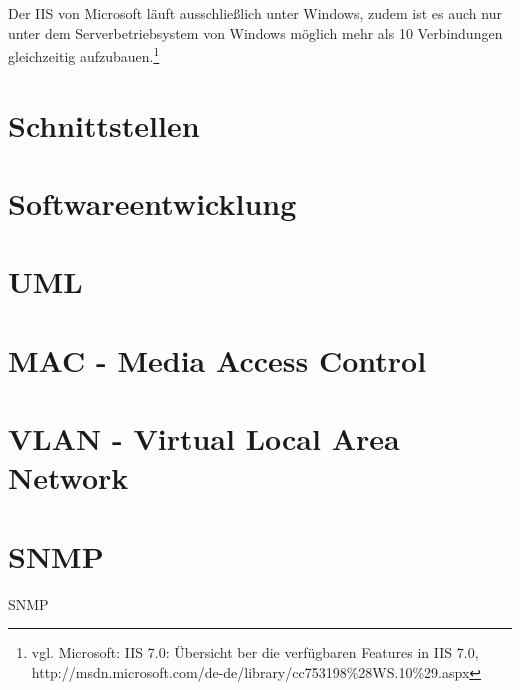 Der IIS von Microsoft läuft ausschließlich unter Windows, zudem ist es auch nur unter dem Serverbetriebsystem von Windows möglich mehr als 10 Verbindungen gleichzeitig aufzubauen.\footnote{vgl. Microsoft: IIS 7.0: Übersicht ber die verfügbaren Features in IIS 7.0, http://msdn.microsoft.com/de-de/library/cc753198\%28WS.10\%29.aspx}

\section{Schnittstellen}
\label{sec:schnittstellen}

\section{Softwareentwicklung}
\label{sec:softdev}

\section{UML}
\label{sec:uml}

\section{MAC - Media Access Control}
\label{sec:mac}

\section{VLAN - Virtual Local Area Network}
\label{sec:vlan}

\section{SNMP}
\label{sec:snmp}

SNMP

